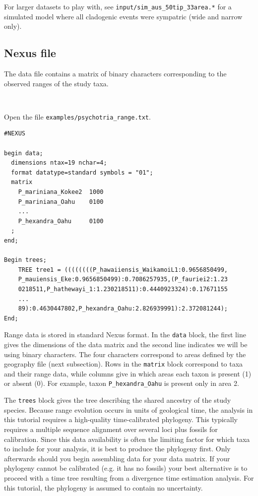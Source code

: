 \documentclass[11pt]{article}
\newcommand{\impmark}{\strut\vadjust{\domark}}
\newcommand{\domark}{%
  \vbox to 0pt{
    \kern-\dp\strutbox
    \smash{\llap{$\rightarrow$\kern1em}}
    \vss
  }%
}
\begin{document}
For larger datasets to play with, see {\tt input/sim\_aus\_50tip\_33area.*} for a simulated model where all cladogenic events were sympatric (wide and narrow only). 

\subsection{Nexus file}

The data file contains a matrix of binary characters corresponding to the observed ranges of the study taxa.

\noindent \\ \impmark  Open the file \texttt{examples/psychotria\_range.txt}.

\begin{framed}
\begin{lstlisting}
#NEXUS

begin data;
  dimensions ntax=19 nchar=4;
  format datatype=standard symbols = "01";
  matrix
    P_mariniana_Kokee2  1000
    P_mariniana_Oahu    0100
    ...
    P_hexandra_Oahu     0100
  ;
end;

Begin trees;
	TREE tree1 = ((((((((P_hawaiiensis_WaikamoiL1:0.9656850499,
	P_mauiensis_Eke:0.9656850499):0.7086257935,(P_fauriei2:1.23
	0218511,P_hathewayi_1:1.230218511):0.4440923324):0.17671155
	...
	89):0.4630447802,P_hexandra_Oahu:2.826939991):2.372081244);
End;
\end{lstlisting}
\end{framed}

Range data is stored in standard Nexus format.
In the {\tt data} block, the first line gives the dimensions of the data matrix and the second line indicates we will be using binary characters.
The four characters correspond to areas defined by the geography file (next subsection).
Rows in the {\tt matrix} block correspond to taxa and their range data, while columns give in which areas each taxon is present (1) or absent (0).
For example, taxon {\tt P\_hexandra\_Oahu} is present only in area 2.

The {\tt trees} block gives the tree describing the shared ancestry of the study species.
Because range evolution occurs in units of geological time, the analysis in this tutorial requires a high-quality time-calibrated phylogeny.
This typically requires a multiple sequence alignment over several loci plus fossils for calibration.
Since this data availability is often the limiting factor for which taxa to include for your analysis, it is best to produce the phylogeny first.
Only afterwards should you begin assembling data for your data matrix.
If your phylogeny cannot be calibrated (e.g. it has no fossils) your best alternative is to proceed with a time tree resulting from a divergence time estimation analysis.
For this tutorial, the phylogeny is assumed to contain no uncertainty.
\end{document}
